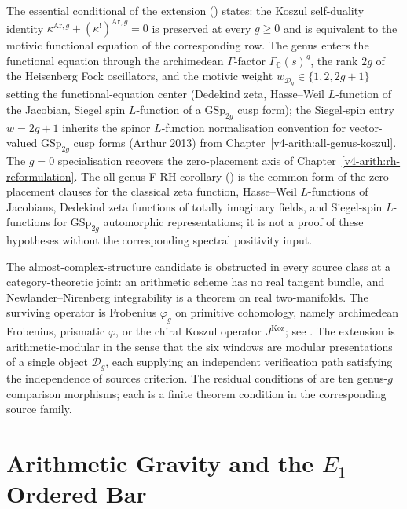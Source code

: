 The essential conditional of the extension
() states: the Koszul self-duality
identity \(\kappa^{\mathrm{Ar},g}+(\kappa^{!})^{\mathrm{Ar},g}=0\) is
preserved at every \(g\geq 0\) and is equivalent to the motivic
functional equation of the corresponding row. The genus enters the
functional equation through the archimedean \(\Gamma\)-factor
\(\Gamma_{\mathbb{C}}(s)^g\), the rank \(2g\) of the Heisenberg Fock
oscillators, and the motivic weight \(w_{\mathcal{D}_g}\in\{1,2,2g+1\}\)
setting the functional-equation center (Dedekind zeta, Hasse--Weil
\(L\)-function of the Jacobian, Siegel spin \(L\)-function of a
\(\mathrm{GSp}_{2g}\) cusp form); the Siegel-spin entry \(w=2g+1\)
inherits the spinor \(L\)-function normalisation convention for
vector-valued \(\mathrm{GSp}_{2g}\) cusp forms (Arthur 2013) from
Chapter~\ref{v4-arith:all-genus-koszul}. The \(g=0\) specialisation
recovers the zero-placement axis of
Chapter~\ref{v4-arith:rh-reformulation}. The all-genus F-RH corollary
() is the common form of the
zero-placement clauses for the classical zeta function, Hasse--Weil
\(L\)-functions of Jacobians, Dedekind zeta functions of totally
imaginary fields, and Siegel-spin \(L\)-functions for
\(\mathrm{GSp}_{2g}\) automorphic representations; it is not a proof
of these hypotheses without the corresponding spectral positivity
input.

The almost-complex-structure candidate is obstructed in every source
class at a category-theoretic joint: an arithmetic scheme has no real
tangent bundle, and Newlander--Nirenberg integrability is a theorem on
real two-manifolds. The surviving operator is Frobenius
\(\varphi_g\) on primitive cohomology, namely archimedean Frobenius,
prismatic \(\varphi\), or the chiral Koszul operator
\(J^{\mathrm{Koz}}\); see
. The extension is
arithmetic-modular in the sense that the six windows are modular
presentations of a single object \(\mathcal{D}_g\), each supplying an
independent verification path satisfying the independence of sources
criterion. The residual conditions of
 are ten genus-\(g\) comparison morphisms;
each is a finite theorem condition in the corresponding source family.

\section{Arithmetic Gravity and the \(E_1\) Ordered Bar}
\label{v4-arith:manifesto:arith-gravity}

